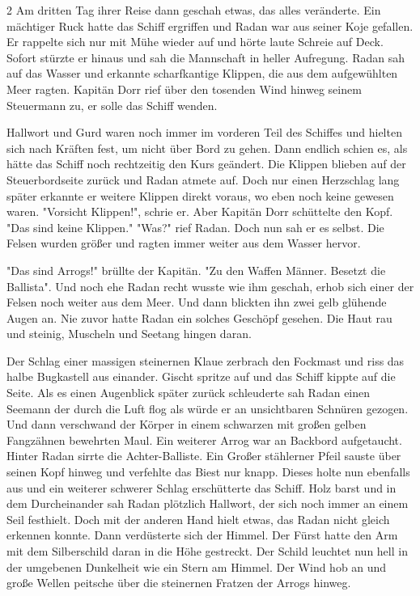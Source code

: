 \documentclass[10pt, a4paper, oneside]{book}
\begin{document}
\begin{multicols}{2}
Am dritten Tag ihrer Reise dann geschah etwas, das alles veränderte. Ein mächtiger Ruck hatte das Schiff ergriffen und Radan war aus seiner Koje gefallen. Er rappelte sich nur mit Mühe wieder auf und hörte laute Schreie auf Deck. Sofort stürzte er hinaus und sah die Mannschaft in heller Aufregung. Radan sah auf das Wasser und erkannte scharfkantige Klippen, die aus dem aufgewühlten Meer ragten. Kapitän Dorr rief über den tosenden Wind hinweg seinem Steuermann zu, er solle das Schiff wenden.\bigskip

Hallwort und Gurd waren noch immer im vorderen Teil des Schiffes und hielten sich nach Kräften fest, um nicht über Bord zu gehen. Dann endlich schien es, als hätte das Schiff noch rechtzeitig den Kurs geändert. Die Klippen blieben auf der Steuerbordseite zurück und Radan atmete auf. Doch nur einen Herzschlag lang später erkannte er weitere Klippen direkt voraus, wo eben noch keine gewesen waren. "Vorsicht Klippen!", schrie er. Aber Kapitän Dorr schüttelte den Kopf. "Das sind keine Klippen." "Was?" rief Radan. Doch nun sah er es selbst. Die Felsen wurden größer und ragten immer weiter aus dem Wasser hervor.\bigskip

"Das sind Arrogs!" brüllte der Kapitän. "Zu den Waffen Männer. Besetzt die Ballista". Und noch ehe Radan recht wusste wie ihm geschah, erhob sich einer der Felsen noch weiter aus dem Meer. Und dann blickten  ihn zwei gelb glühende Augen an. Nie zuvor hatte Radan ein solches Geschöpf gesehen. Die Haut rau und steinig, Muscheln und Seetang hingen daran.\bigskip

Der Schlag einer massigen steinernen Klaue zerbrach den Fockmast und riss das halbe Bugkastell aus einander. Gischt spritze auf und das Schiff kippte auf die Seite. Als es einen Augenblick später zurück schleuderte sah Radan einen Seemann der durch die Luft flog als würde er an unsichtbaren Schnüren gezogen. Und dann verschwand der Körper in einem schwarzen mit großen gelben Fangzähnen bewehrten Maul. Ein weiterer Arrog war an Backbord aufgetaucht. Hinter Radan sirrte die Achter-Balliste. Ein Großer stählerner Pfeil sauste über seinen Kopf hinweg und verfehlte das Biest nur knapp. Dieses holte nun ebenfalls aus und ein weiterer schwerer Schlag erschütterte das Schiff. Holz barst und in dem Durcheinander sah Radan plötzlich Hallwort, der sich noch immer an einem Seil festhielt. Doch mit der anderen Hand hielt etwas, das Radan nicht gleich erkennen konnte. Dann  verdüsterte sich der Himmel. Der Fürst hatte den Arm mit dem Silberschild daran in die Höhe gestreckt. Der Schild leuchtet nun hell in der umgebenen Dunkelheit wie ein Stern am Himmel. Der Wind hob an und große Wellen peitsche über die steinernen Fratzen der Arrogs hinweg.\bigskip


\end{multicols}
\end{document}
